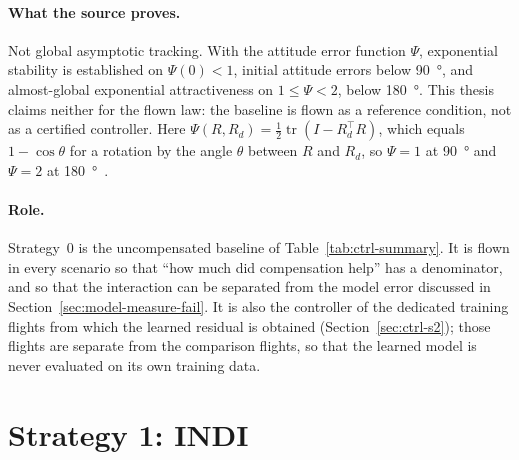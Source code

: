 \paragraph{What the source proves.} Not global asymptotic tracking. With the attitude error
function $\Psi$, exponential stability is established on $\Psi(0) < 1$, initial attitude errors
below \SI{90}{\degree}, and almost-global exponential attractiveness on $1 \le \Psi < 2$,
below \SI{180}{\degree}. This thesis claims neither for the flown law: the baseline is flown as a
reference condition, not as a certified controller.
Here $\Psi(R, R_d) = \tfrac{1}{2}\operatorname{tr}(I - R_d^\top R)$, which equals $1 - \cos\theta$
for a rotation by the angle $\theta$ between $R$ and $R_d$, so $\Psi = 1$ at \SI{90}{\degree} and
$\Psi = 2$ at \SI{180}{\degree}~\cite{lee2010geometricse3}.

\paragraph{Role.} Strategy~0 is the uncompensated baseline of Table~\ref{tab:ctrl-summary}. It is
flown in every scenario so that ``how much did compensation help'' has a denominator, and so that
the interaction can be separated from the model error discussed in
Section~\ref{sec:model-measure-fail}. It is also the controller of the dedicated training flights
from which the learned residual is obtained (Section~\ref{sec:ctrl-s2}); those flights are separate
from the comparison flights, so that the learned model is never evaluated on its own training data.

\section{Strategy 1: INDI}
\label{sec:ctrl-s1}

